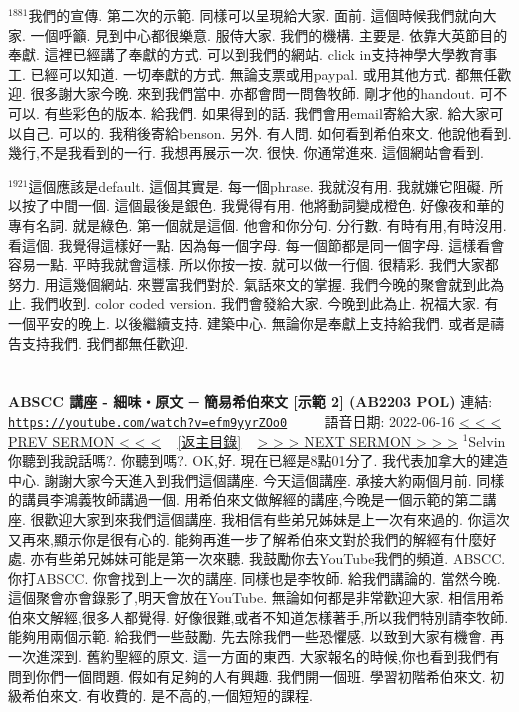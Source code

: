 \documentclass{book}
\begin{document}
$^{1881}$我們的宣傳.
第二次的示範.
同樣可以呈現給大家.
面前.
這個時候我們就向大家.
一個呼籲.
見到中心都很樂意.
服侍大家.
我們的機構.
主要是.
依靠大英節目的奉獻.
這裡已經講了奉獻的方式.
可以到我們的網站.
click in支持神學大學教育事工.
已經可以知道.
一切奉獻的方式.
無論支票或用paypal.
或用其他方式.
都無任歡迎.
很多謝大家今晚.
來到我們當中.
亦都會問一問魯牧師.
剛才他的handout.
可不可以.
有些彩色的版本.
給我們.
如果得到的話.
我們會用email寄給大家.
給大家可以自己.
可以的.
我稍後寄給benson.
另外.
有人問.
如何看到希伯來文.
他說他看到.
幾行,不是我看到的一行.
我想再展示一次.
很快.
你通常進來.
這個網站會看到.

$^{1921}$這個應該是default.
這個其實是.
每一個phrase.
我就沒有用.
我就嫌它阻礙.
所以按了中間一個.
這個最後是銀色.
我覺得有用.
他將動詞變成橙色.
好像夜和華的專有名詞.
就是綠色.
第一個就是這個.
他會和你分句.
分行數.
有時有用,有時沒用.
看這個.
我覺得這樣好一點.
因為每一個字母.
每一個節都是同一個字母.
這樣看會容易一點.
平時我就會這樣.
所以你按一按.
就可以做一行個.
很精彩.
我們大家都努力.
用這幾個網站.
來豐富我們對於.
氣話來文的掌握.
我們今晚的聚會就到此為止.
我們收到.
color coded version.
我們會發給大家.
今晚到此為止.
祝福大家.
有一個平安的晚上.
以後繼續支持.
建築中心.
無論你是奉獻上支持給我們.
或者是禱告支持我們.
我們都無任歡迎.

\newpage



\section{}
\label{sec:efm9yyrZOo0}
\textbf{ABSCC 講座 - 細味‧原文 ─ 簡易希伯來文 [示範 2] (AB2203 POL)}
\newline
\newline
連結: \href{https://youtube.com/watch?v=efm9yyrZOo0}{\texttt{https://youtube.com/watch?v=efm9yyrZOo0}} ~~~~ 語音日期: 2022-06-16
\newline
\newline
\hyperref[sec:L8_DVqUvOSM]{\small{< < < PREV SERMON < < <}}
~
\hyperref[sec:index]{\small{[返主目錄]}}
~
\hyperref[sec:3o4omcoTUB4]{\small{> > > NEXT SERMON > > >}}
\newline
\newline
$^{1}$Selvin你聽到我說話嗎?.
你聽到嗎?.
OK,好.
現在已經是8點01分了.
我代表加拿大的建造中心.
謝謝大家今天進入到我們這個講座.
今天這個講座.
承接大約兩個月前.
同樣的講員李鴻義牧師講過一個.
用希伯來文做解經的講座,今晚是一個示範的第二講座.
很歡迎大家到來我們這個講座.
我相信有些弟兄姊妹是上一次有來過的.
你這次又再來,顯示你是很有心的.
能夠再進一步了解希伯來文對於我們的解經有什麼好處.
亦有些弟兄姊妹可能是第一次來聽.
我鼓勵你去YouTube我們的頻道.
ABSCC.
你打ABSCC.
你會找到上一次的講座.
同樣也是李牧師.
給我們講論的.
當然今晚.
這個聚會亦會錄影了,明天會放在YouTube.
無論如何都是非常歡迎大家.
相信用希伯來文解經,很多人都覺得.
好像很難,或者不知道怎樣著手,所以我們特別請李牧師.
能夠用兩個示範.
給我們一些鼓勵.
先去除我們一些恐懼感.
以致到大家有機會.
再一次進深到.
舊約聖經的原文.
這一方面的東西.
大家報名的時候,你也看到我們有問到你們一個問題.
假如有足夠的人有興趣.
我們開一個班.
學習初階希伯來文.
初級希伯來文.
有收費的.
是不高的,一個短短的課程.
\end{document}
